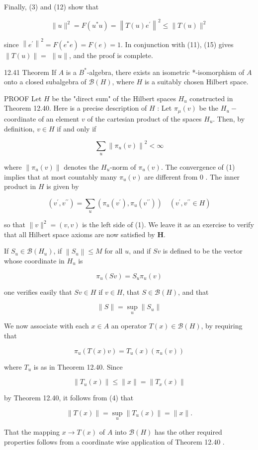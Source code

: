 \documentclass[10pt]{article}
\begin{document}
Finally, (3) and (12) show that

$$
\|u\|^{2}=F\left(u^{*} u\right)=\left\|T(u) e^{\prime}\right\|^{2} \leq\|T(u)\|^{2}
$$

since $\left\|e^{\prime}\right\|^{2}=F\left(e^{*} e\right)=F(e)=1$. In conjunction with (11), (15) gives $\|T(u)\|=$ $\|u\|$, and the proof is complete.

12.41 Theorem If $A$ is a $B^{*}$-algebra, there exists an isometric *-isomorphism of $A$ onto a closed subalgebra of $\mathscr{B}(H)$, where $H$ is a suitably chosen Hilbert space.

PROOF Let $H$ be the "direct sum" of the Hilbert spaces $H_{u}$ constructed in Theorem 12.40. Here is a precise description of $H$ : Let $\pi_{\mu}(v)$ be the $H_{u}-$ coordinate of an element $v$ of the cartesian product of the spaces $H_{u}$. Then, by definition, $v \in H$ if and only if

$$
\sum_{u}\left\|\pi_{u}(v)\right\|^{2}<\infty
$$

where $\left\|\pi_{u}(v)\right\|$ denotes the $H_{u}$-norm of $\pi_{u}(v)$. The convergence of (1) implies that at most countably many $\pi_{u}(v)$ are different from 0 . The inner product in $H$ is given by

$$
\left(v^{\prime}, v^{\prime \prime}\right)=\sum_{u}\left(\pi_{u}\left(v^{\prime}\right), \pi_{u}\left(v^{\prime \prime}\right)\right) \quad\left(v^{\prime}, v^{\prime \prime} \in H\right)
$$

so that $\|v\|^{2}=(v, v)$ is the left side of (1). We leave it as an exercise to verify that all Hilbert space axioms are now satisfied by $\boldsymbol{H}$.

If $S_{u} \in \mathscr{B}\left(H_{u}\right)$, if $\left\|S_{u}\right\| \leq M$ for all $u$, and if $S v$ is defined to be the vector whose coordinate in $H_{u}$ is

$$
\pi_{u}(S v)=S_{u} \pi_{u}(v)
$$

one verifies easily that $S v \in H$ if $v \in H$, that $S \in \mathscr{B}(H)$, and that

$$
\|S\|=\sup _{u}\left\|S_{u}\right\|
$$

We now associate with each $x \in A$ an operator $T(x) \in \mathscr{B}(H)$, by requiring that

$$
\pi_{u}(T(x) v)=T_{u}(x)\left(\pi_{u}(v)\right)
$$

where $T_{u}$ is as in Theorem 12.40. Since

$$
\left\|T_{u}(x)\right\| \leq\|x\|=\left\|T_{x}(x)\right\|
$$

by Theorem 12.40, it follows from (4) that

$$
\|T(x)\|=\sup _{u}\left\|T_{u}(x)\right\|=\|x\| .
$$

That the mapping $x \rightarrow T(x)$ of $A$ into $\mathscr{B}(H)$ has the other required properties follows from a coordinate wise application of Theorem 12.40 .
\end{document}
